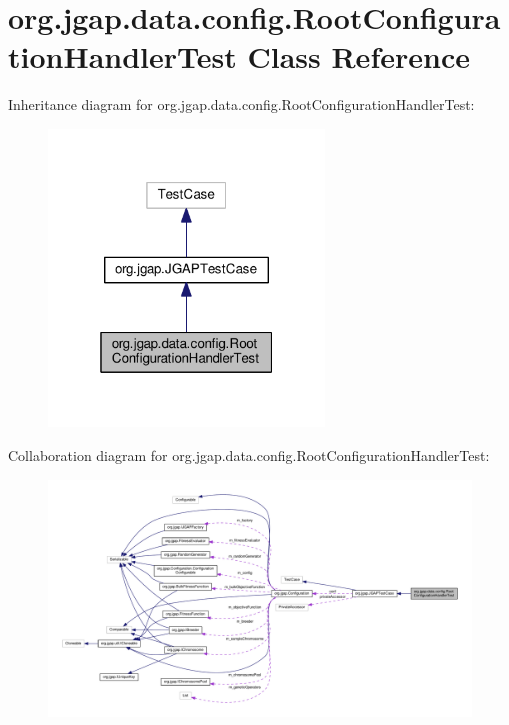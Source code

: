 \hypertarget{classorg_1_1jgap_1_1data_1_1config_1_1_root_configuration_handler_test}{\section{org.\-jgap.\-data.\-config.\-Root\-Configuration\-Handler\-Test Class Reference}
\label{classorg_1_1jgap_1_1data_1_1config_1_1_root_configuration_handler_test}
}


Inheritance diagram for org.\-jgap.\-data.\-config.\-Root\-Configuration\-Handler\-Test\-:
\nopagebreak
\begin{figure}[H]
\begin{center}
\leavevmode
\includegraphics[width=208pt]{classorg_1_1jgap_1_1data_1_1config_1_1_root_configuration_handler_test__inherit__graph}
\end{center}
\end{figure}


Collaboration diagram for org.\-jgap.\-data.\-config.\-Root\-Configuration\-Handler\-Test\-:
\nopagebreak
\begin{figure}[H]
\begin{center}
\leavevmode
\includegraphics[width=350pt]{classorg_1_1jgap_1_1data_1_1config_1_1_root_configuration_handler_test__coll__graph}
\end{center}
\end{figure}
